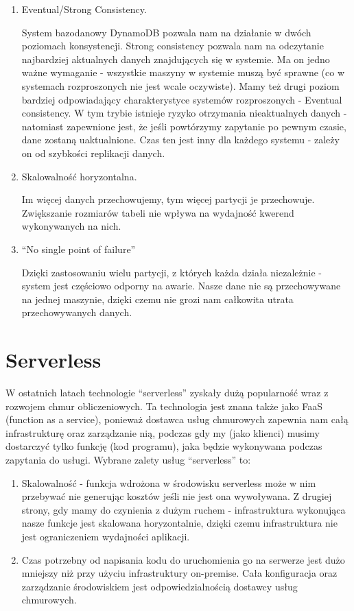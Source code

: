 \begin{enumerate}
    \item Eventual/Strong Consistency.

System bazodanowy DynamoDB pozwala nam na działanie w dwóch poziomach konsystencji. Strong consistency pozwala nam na odczytanie najbardziej aktualnych danych znajdujących się w systemie. Ma on jedno ważne wymaganie - wszystkie maszyny w systemie muszą być sprawne (co w systemach rozproszonych nie jest wcale oczywiste). Mamy też drugi poziom bardziej odpowiadający charakterystyce systemów rozproszonych - Eventual consistency. W tym trybie istnieje ryzyko otrzymania nieaktualnych danych - natomiast zapewnione jest, że jeśli powtórzymy zapytanie po pewnym czasie, dane zostaną uaktualnione. Czas ten jest inny dla każdego systemu - zależy on od szybkości replikacji danych.

    \item Skalowalność horyzontalna.

Im więcej danych przechowujemy, tym więcej partycji je przechowuje. Zwiększanie rozmiarów tabeli nie wpływa na wydajność kwerend wykonywanych na nich. 

    \item “No single point of failure”

Dzięki zastosowaniu wielu partycji, z których każda działa niezależnie - system jest częściowo odporny na awarie. Nasze dane nie są przechowywane na jednej maszynie, dzięki czemu nie grozi nam całkowita utrata przechowywanych danych.
\end{enumerate}


\section{Serverless}
\label{sec:serverless}

W ostatnich latach technologie “serverless” zyskały dużą popularność wraz z rozwojem chmur obliczeniowych. Ta technologia jest znana także jako FaaS (function as a service), ponieważ dostawca usług chmurowych zapewnia nam całą infrastrukturę oraz zarządzanie nią, podczas gdy my (jako klienci) musimy dostarczyć tylko funkcję (kod programu), jaka będzie wykonywana podczas zapytania do usługi. Wybrane zalety usług “serverless” to:

\begin{enumerate}
    \item Skalowalność - funkcja  wdrożona w środowisku serverless może w nim przebywać nie generując kosztów jeśli nie jest ona wywoływana. Z drugiej strony, gdy mamy do czynienia z dużym ruchem - infrastruktura wykonująca nasze funkcje jest skalowana horyzontalnie, dzięki czemu infrastruktura nie jest ograniczeniem wydajności aplikacji.
    
    \item Czas potrzebny od napisania kodu do uruchomienia go na serwerze jest dużo mniejszy niż przy użyciu infrastruktury on-premise. Cała konfiguracja oraz zarządzanie środowiskiem jest odpowiedzialnością dostawcy usług chmurowych.
\end{enumerate}

